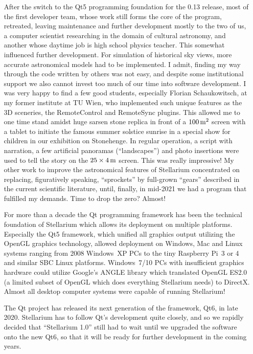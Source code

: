 After the switch to the Qt5 programming foundation for the 0.13
release, most of the first developer team, whose work still forms the
core of the program, retreated, leaving maintenance and further
development mostly to the two of us, a computer scientist researching
in the domain of cultural astronomy, and another whose daytime job is
high school physics teacher. This somewhat influenced further
development. For simulation of historical sky views, more accurate
astronomical models had to be implemented. I admit, finding my way
through the code written by others was not easy, and despite some
institutional support we also cannot invest too much of our time into
software development. I was very happy to find a few good students,
especially Florian Schaukowitsch, at my former institute at TU Wien,
who implemented such unique features as the 3D sceneries, the RemoteControl
and RemoteSync plugins. This allowed me to one time stand amidst huge
sarsen stone replica in front of a $100\,\mathrm{m}^2$ screen with a tablet to initiate
the famous summer solstice sunrise in a special show for children in our
exhibition on Stonehenge. In regular operation, a script with narration,
a few artificial panoramas (``landscapes'') and photo insertions were used to tell the
story on the $25\times4\,\mathrm{m}$ screen. This was really impressive!
My other work to improve the astronomical
features of Stellarium concentrated on replacing, figuratively
speaking, ``sprockets'' by full-grown ``gears'' described in the
current scientific literature, until, finally, in mid-2021 we had a
program that fulfilled my demands. Time to drop the zero? Almost!

For more than a decade the Qt programming framework has been the
technical foundation of Stellarium which allows its deployment on
multiple platforms. Especially the Qt5 framework, which unified all
graphics output utilizing the OpenGL graphics technology, allowed
deployment on Windows, Mac and Linux systems ranging from 2008
Windows~XP PCs to the tiny Raspberry Pi~3 or 4 and similar SBC Linux platforms. Windows~7/10
PCs with insufficient graphics hardware could utilize Google's ANGLE
library which translated OpenGL ES2.0 (a limited subset of OpenGL
which does everything Stellarium needs) to DirectX. Almost all desktop
computer systems were capable of running Stellarium!

The Qt project has released its next generation of the framework, Qt6,
in late 2020. Stellarium has to follow Qt's development quite closely,
and so we rapidly decided that ``Stellarium 1.0'' still had to wait
until we upgraded the software onto the new Qt6, so that it will be
ready for further development in the coming years.

